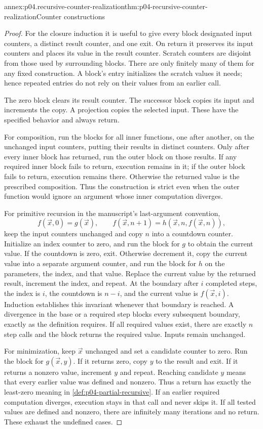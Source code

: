 \begin{annexitem}{annex:p04.recursive-counter-realization}{thm:p04-recursive-counter-realization}{Counter constructions}
\begin{proof}
For the closure induction it is useful to give every block designated
input counters, a distinct result counter, and one exit. On return it
preserves its input counters and places its value in the result counter.
Scratch counters are disjoint from those used by surrounding blocks.
There are only finitely many of them for any fixed construction.
A block's entry initializes the scratch values it needs; hence repeated
entries do not rely on their values from an earlier call.

The zero block clears its result counter. The successor block copies its
input and increments the copy. A projection copies the selected input.
These have the specified behavior and always return.

For composition, run the blocks for all inner functions, one after
another, on the unchanged input counters, putting their results in
distinct counters. Only after every inner block has returned, run the
outer block on those results. If any required inner block fails to
return, execution remains in it; if the outer block fails to return,
execution remains there. Otherwise the returned value is the prescribed
composition. Thus the construction is strict even when the outer
function would ignore an argument whose inner computation diverges.

For primitive recursion in the manuscript's last-argument convention,
\[
 f(\vec x,0)=g(\vec x),\qquad
 f(\vec x,n+1)=h(\vec x,n,f(\vec x,n)),
\]
keep the input counters unchanged and copy \(n\) into a countdown
counter. Initialize an index counter to zero, and run the block for
\(g\) to obtain the current value. If the countdown is zero, exit.
Otherwise decrement it, copy the current value into a separate argument
counter, and run the block for \(h\) on the parameters, the index, and
that value. Replace the current value by the returned result, increment
the index, and repeat. At the boundary after \(i\) completed steps, the
index is \(i\), the countdown is \(n-i\), and the current value is
\(f(\vec x,i)\). Induction establishes this invariant whenever that
boundary is reached. A divergence in the base or a required step blocks
every subsequent boundary, exactly as the definition requires. If all
required values exist, there are exactly \(n\) step calls and the block
returns the required value. Inputs remain unchanged.

For minimization, keep \(\vec x\) unchanged and set a candidate counter
to zero. Run the block for \(g(\vec x,y)\). If it returns zero, copy
\(y\) to the result and exit. If it returns a nonzero value, increment
\(y\) and repeat. Reaching candidate \(y\) means that every earlier
value was defined and nonzero. Thus a return has exactly the least-zero
meaning in \cref{def:p04-partial-recursive}. If an earlier required
computation diverges, execution stays in that call and never skips it.
If all tested values are defined and nonzero, there are infinitely many
iterations and no return. These exhaust the undefined cases.


\end{proof}
\end{annexitem}
